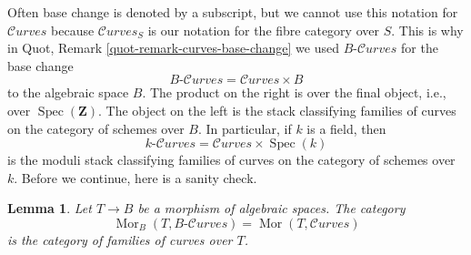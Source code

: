 \documentclass{stacks-project}
\theoremstyle{plain}
\newtheorem{lemma}[subsection]{Lemma}
\theoremstyle{definition}
\theoremstyle{remark}
\numberwithin{equation}{subsection}
\def\Spec{\mathop{\mathrm{Spec}}}
\def\Mor{\mathop{\mathrm{Mor}}\nolimits}
\def\Curvesstack{\mathcal{C}\!\mathit{urves}}
\begin{document}
\medskip\noindent
Often base change is denoted by a subscript, but we cannot use
this notation for $\Curvesstack$ because $\Curvesstack_S$
is our notation for the fibre category over $S$.
This is why in Quot, Remark \ref{quot-remark-curves-base-change}
we used $B\text{-}\Curvesstack$ for the base change
$$
B\text{-}\Curvesstack = \Curvesstack \times B
$$
to the algebraic space $B$. The product on the right is over the
final object, i.e., over $\Spec(\mathbf{Z})$. The object on the left
is the stack classifying families of curves on the category of schemes
over $B$. In particular, if $k$ is a field, then
$$
k\text{-}\Curvesstack = \Curvesstack \times \Spec(k)
$$
is the moduli stack classifying families of curves on the category
of schemes over $k$.
Before we continue, here is a sanity check.

\begin{lemma}
\label{lemma-extend-curves-to-spaces}
Let $T \to B$ be a morphism of algebraic spaces. The category
$$
\Mor_B(T, B\text{-}\Curvesstack) = \Mor(T, \Curvesstack)
$$
is the category of families of curves over $T$.
\end{lemma}
\end{document}
